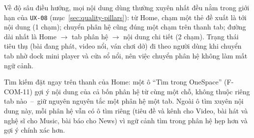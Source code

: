 Về độ sâu điều hướng, mọi nội dung dùng thường xuyên nhất đều nằm trong giới hạn của \texttt{UX-08} (mục~\ref{sec:quality-pillars}): từ Home, chạm một thẻ đề xuất là tới nội dung (1 chạm); chuyển phân hệ cũng đúng một chạm trên thanh tab; đường dài nhất là Home $\rightarrow$ tab phân hệ $\rightarrow$ nội dung chi tiết (2 chạm). Trạng thái tiêu thụ (bài đang phát, video nổi, ván chơi dở) đi theo người dùng khi chuyển tab nhờ dock mini player và cửa sổ nổi, nên việc chuyển phân hệ không làm mất ngữ cảnh.

Tìm kiếm đặt ngay trên thanh của Home: một ô ``Tìm trong OneSpace'' (F-COM-11) gợi ý nội dung của cả bốn phân hệ từ cùng một chỗ, không thuộc riêng tab nào~--~giữ nguyên nguyên tắc một phân hệ một tab. Ngoài ô tìm xuyên nội dung này, mỗi phân hệ vẫn có ô tìm riêng (tiêu đề và kênh cho Video, bài hát và nghệ sĩ cho Music, bài báo cho News) vì ngữ cảnh tìm trong phân hệ hẹp hơn và gợi ý chính xác hơn.
